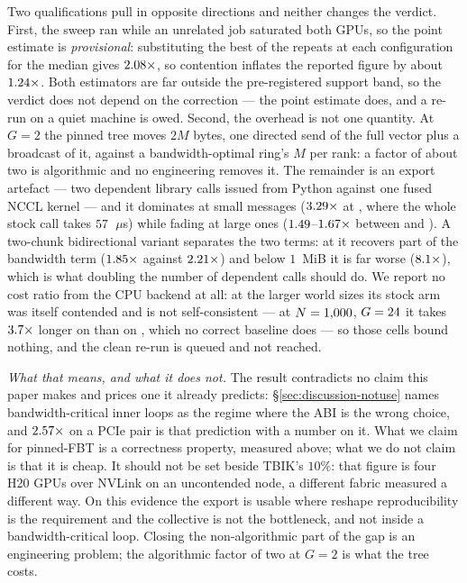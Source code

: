 \documentclass[journal,10pt]{IEEEtran}
\theoremstyle{plain}
\theoremstyle{definition}
\theoremstyle{remark}
\begin{document}
Two qualifications pull in opposite directions and neither changes the
verdict. First, the sweep ran while an unrelated job saturated both GPUs, so
the point estimate is \emph{provisional}: substituting the best of the repeats
at each configuration for the median gives $2.08\times$, so
contention inflates the reported figure by about $1.24\times$. Both
estimators are far outside the pre-registered support band, so the verdict does
not depend on the correction --- the point estimate does, and a re-run on a
quiet machine is owed. Second, the overhead is not one quantity. At $G=2$ the
pinned tree moves $2M$ bytes, one directed send of the full vector plus a
broadcast of it, against a bandwidth-optimal ring's $M$ per rank: a factor of
about two is algorithmic and no engineering removes it. The remainder is an
export artefact --- two dependent library calls issued from Python against one
fused NCCL kernel --- and it dominates at small messages
($3.29\times$ at \PinSmallSize{}, where the whole stock call takes
$57$~$\mu$s) while fading at large ones
($1.49$--$1.67\times$ between \PinLargeSizeLo{} and
\PinLargeSizeHi{}). A two-chunk bidirectional variant separates the two
terms: at \PinBigSize{} it recovers part of the bandwidth term
($1.85\times$ against $2.21\times$) and below $1$~MiB it
is far worse ($8.1\times$), which is what doubling the number of
dependent calls should do. We report no cost ratio from the CPU backend at
all: at the larger world sizes its stock arm was itself contended and is not
self-consistent --- at $N=1{,}000{}$, $G=24{}$ it takes
$3.7\times$ longer on \PinGlooBadLo{} than on \PinGlooBadHi{},
which no correct baseline does --- so those cells bound nothing, and the clean
re-run is queued and not reached.

\emph{What that means, and what it does not.} The result contradicts no claim
this paper makes and prices one it already predicts:
\S\ref{sec:discussion-notuse} names bandwidth-critical inner loops as the
regime where the ABI is the wrong choice, and $2.57\times$ on a PCIe pair is that prediction with a number
on it. What we claim for pinned-FBT is a correctness property, measured above;
what we do not claim is that it is cheap. It should not be set beside TBIK's
$10\%$: that figure is four H20 GPUs over NVLink on an uncontended node,
a different fabric measured a different way. On this evidence the export is
usable where reshape reproducibility is the requirement and the collective is
not the bottleneck, and not inside a bandwidth-critical loop. Closing the
non-algorithmic part of the gap is an engineering problem; the algorithmic
factor of two at $G=2$ is what the tree costs.
\end{document}
